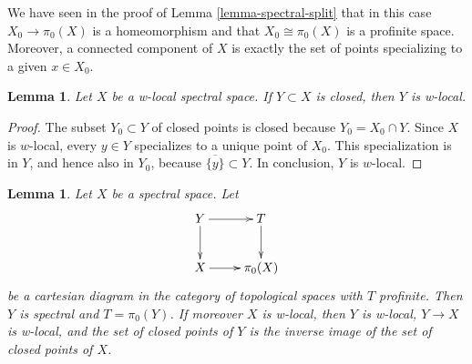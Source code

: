 \documentclass{stacks-project}
\theoremstyle{plain}
\newtheorem{lemma}[subsection]{Lemma}
\theoremstyle{definition}
\theoremstyle{remark}
\numberwithin{equation}{subsection}
\begin{document}
\noindent
We have seen in the proof of Lemma \ref{lemma-spectral-split}
that in this case $X_0 \to \pi_0(X)$ is a homeomorphism and that
$X_0 \cong \pi_0(X)$ is a profinite space. Moreover, a connected
component of $X$ is exactly the set of points specializing to
a given $x \in X_0$.

\begin{lemma}
\label{lemma-closed-subspace-w-local}
Let $X$ be a w-local spectral space. If $Y \subset X$ is closed,
then $Y$ is w-local.
\end{lemma}

\begin{proof}
The subset $Y_0 \subset Y$ of closed points is closed because
$Y_0 = X_0 \cap Y$. Since $X$ is $w$-local, every $y \in Y$ specializes
to a unique point of $X_0$. This specialization is in $Y$, and hence
also in $Y_0$, because $\overline{\{y\}}\subset Y$. In conclusion, $Y$
is $w$-local.
\end{proof}

\begin{lemma}
\label{lemma-silly}
Let $X$ be a spectral space. Let
$$
\xymatrix{
Y \ar[r] \ar[d] & T \ar[d] \\
X \ar[r] & \pi_0(X)
}
$$
be a cartesian diagram in the category of topological spaces
with $T$ profinite. Then $Y$ is spectral and $T = \pi_0(Y)$.
If moreover $X$ is w-local, then $Y$ is w-local, $Y \to X$ is w-local,
and the set of closed points of $Y$ is the inverse image of the
set of closed points of $X$.
\end{lemma}
\end{document}

